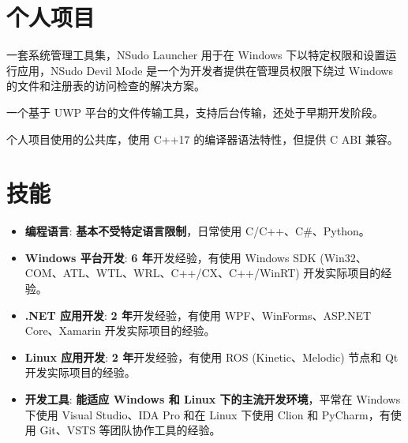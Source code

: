 \documentclass{resume}
\begin{document}
\section{个人项目}

一套系统管理工具集，NSudo Launcher 用于在 Windows 下以特定权限和设置运行应用，NSudo Devil Mode 是一个为开发者提供在管理员权限下绕过 Windows 的文件和注册表的访问检查的解决方案。

一个基于 UWP 平台的文件传输工具，支持后台传输，还处于早期开发阶段。

个人项目使用的公共库，使用 C++17 的编译器语法特性，但提供 C ABI 兼容。

\section{技能}
\begin{itemize}

  \item \textbf{编程语言}:
    \textbf{基本不受特定语言限制}，日常使用 C/C++、C\#、Python。

  \item \textbf{Windows 平台开发}:
    \textbf{6 年}开发经验，有使用 Windows SDK (Win32、COM、ATL、WTL、WRL、C++/CX、C++/WinRT) 开发实际项目的经验。

  \item \textbf{.NET 应用开发}:
    \textbf{2 年}开发经验，有使用 WPF、WinForms、ASP.NET Core、Xamarin 开发实际项目的经验。
  
  \item \textbf{Linux 应用开发}:
    \textbf{2 年}开发经验，有使用 ROS (Kinetic、Melodic) 节点和 Qt 开发实际项目的经验。

  \item \textbf{开发工具}:
    \textbf{能适应 Windows 和 Linux 下的主流开发环境}，平常在 Windows 下使用 Visual Studio、IDA Pro 和在 Linux 下使用 Clion 和 PyCharm，有使用 Git、VSTS 等团队协作工具的经验。

\end{itemize}
\end{document}
